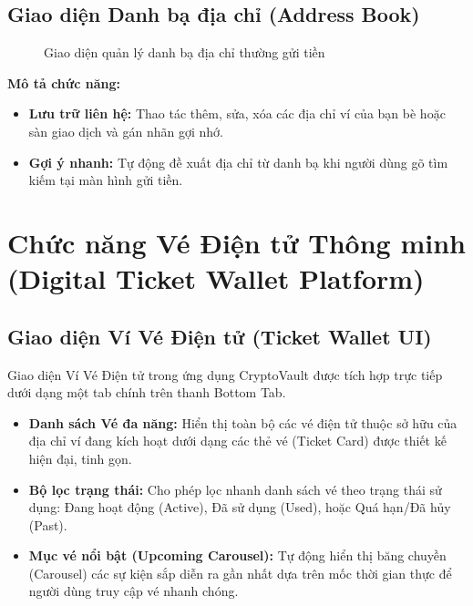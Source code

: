 \documentclass[a4paper]{report}
\begin{document}
\subsection{Giao diện Danh bạ địa chỉ (Address Book)}
\begin{figure}[h]
    \centering
    \caption{Giao diện quản lý danh bạ địa chỉ thường gửi tiền}
    \label{fig:ui_address_book}
\end{figure}

\textbf{Mô tả chức năng:}
\begin{itemize}
    \item \textbf{Lưu trữ liên hệ:} Thao tác thêm, sửa, xóa các địa chỉ ví của bạn bè hoặc sàn giao dịch và gán nhãn gợi nhớ.
    \item \textbf{Gợi ý nhanh:} Tự động đề xuất địa chỉ từ danh bạ khi người dùng gõ tìm kiếm tại màn hình gửi tiền.
\end{itemize}

\section{Chức năng Vé Điện tử Thông minh (Digital Ticket Wallet Platform)}

\subsection{Giao diện Ví Vé Điện tử (Ticket Wallet UI)}
Giao diện Ví Vé Điện tử trong ứng dụng CryptoVault được tích hợp trực tiếp dưới dạng một tab chính trên thanh Bottom Tab.
\begin{itemize}
    \item \textbf{Danh sách Vé đa năng:} Hiển thị toàn bộ các vé điện tử thuộc sở hữu của địa chỉ ví đang kích hoạt dưới dạng các thẻ vé (Ticket Card) được thiết kế hiện đại, tinh gọn.
    \item \textbf{Bộ lọc trạng thái:} Cho phép lọc nhanh danh sách vé theo trạng thái sử dụng: Đang hoạt động (Active), Đã sử dụng (Used), hoặc Quá hạn/Đã hủy (Past).
    \item \textbf{Mục vé nổi bật (Upcoming Carousel):} Tự động hiển thị băng chuyền (Carousel) các sự kiện sắp diễn ra gần nhất dựa trên mốc thời gian thực để người dùng truy cập vé nhanh chóng.
\end{itemize}
\end{document}
